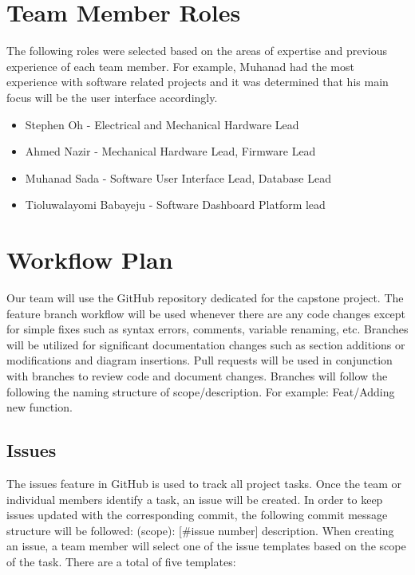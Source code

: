 \documentclass[12pt,titlepage]{article}
\begin{document}
\section{Team Member Roles}
The following roles were selected based on the areas of expertise and previous experience of each team member. 
For example, Muhanad had the most experience with software related projects and it was determined that his main focus will be the user interface accordingly.
\begin{itemize}
	\item Stephen Oh - Electrical and Mechanical Hardware Lead
	\item Ahmed Nazir - Mechanical Hardware Lead, Firmware Lead
	\item Muhanad Sada - Software User Interface Lead, Database Lead
	\item Tioluwalayomi Babayeju - Software Dashboard Platform lead
\end{itemize}


\section{Workflow Plan}
Our team will use the GitHub repository dedicated for the capstone project. The feature
branch workflow will be used whenever there are any code changes except for simple fixes such as syntax errors, comments, variable renaming, etc. 
Branches will be utilized for significant documentation changes such as section additions or modifications and diagram insertions. 
Pull requests will be used in conjunction with branches to review code and document changes.
Branches will follow the following the naming structure of scope/description. For example: Feat/Adding new function.

\newpage

\subsection{Issues}
The issues feature in GitHub is used to track all project tasks. Once the team or individual members identify a task, an issue will be created. In order to keep issues updated with the corresponding commit, the following commit message structure will be followed: (scope): [\#issue number] description. When creating an issue, a team member will select one of the issue templates based on the scope of the task. There are a total of five templates: 
\end{document}
